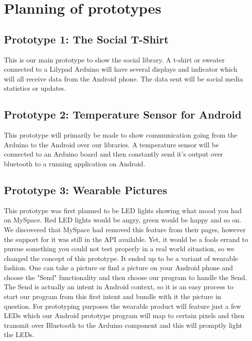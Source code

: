 \newpage
\section{Planning of prototypes}

\subsection{Prototype 1: The Social T-Shirt}

This is our main prototype to show the social library. A t-shirt or sweater connected to a Lilypad Arduino will have several displays and indicator which will all receive data from the Android phone. The data sent will be social media statistics or updates.




\subsection{Prototype 2: Temperature Sensor for Android}

This prototype will primarily be made to show communication going from the Arduino to the Android over our libraries. A temperature sensor will be connected to an Arduino board and then constantly send it's output over bluetooth to a running application on Android. 

\subsection{Prototype 3: Wearable Pictures}

This prototype was first planned to be LED lights showing what mood you had on MySpace. Red LED lights would be angry, green would be happy and so on. We discovered that MySpace had removed this feature from their pages, however the support for it was still in the API available. Yet, it would be a fools errand to pursue something you could not test properly in a real world situation, so we changed the concept of this prototype.
It ended up to be a variant of wearable fashion. One can take a picture or find a picture on your Android phone and choose the "Send" functionality and then choose our program to handle the Send. The Send is actually an intent in Android context, so it is an easy process to start our program from this first intent and bundle with it the picture in question. For prototyping purposes the wearable product will feature just a few LEDs which our Android prototype program will map to certain pixels and then transmit over Bluetooth to the Arduino component and this will promptly light the LEDs. 


